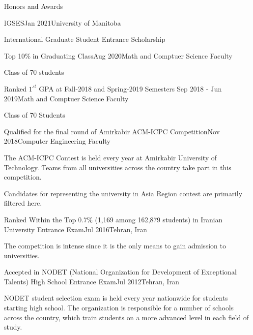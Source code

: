 \documentclass{resume} %
\begin{document}
	\begin{rSection}{Honors and Awards}
		\begin{rSubsection}{IGSES}{Jan 2021}{University of Manitoba}{ }
			\item International Graduate Student Entrance Scholarship
		\end{rSubsection}
		
		\begin{rSubsection}{Top 10\% in Graduating Class}{Aug 2020}{Math and Comptuer Science Faculty}{ }
			\item Class of 70 students
		\end{rSubsection}
		
		\begin{rSubsection}{Ranked $1^{st}$ GPA at Fall-2018 and Spring-2019 Semesters }{Sep 2018 - Jun 2019}{Math and Comptuer Science Faculty}{ }
			\item Class of 70 Students
		\end{rSubsection}	
		
		\begin{rSubsection}{Qualified for the final round of Amirkabir ACM-ICPC Competition}{Nov 2018}{Computer Engineering Faculty}{ }
			\item The ACM-ICPC Contest is held every year at Amirkabir University of Technology. Teams from all universities across the country take part in this competition.
			\item Candidates for representing the university in Asia Region contest are primarily filtered here.
		\end{rSubsection}
		
		\begin{rSubsection}{Ranked Within the Top 0.7\% (1,169 among 162,879 students) in Iranian University Entrance Exam}{Jul 2016}{Tehran, Iran }{ }
			\item The competition is intense since it is the only means to gain admission to universities.
		\end{rSubsection} 
		
		\begin{rSubsection}{Accepted in NODET (National Organization for Development of Exceptional Talents) High School Entrance Exam}{Jul 2012}{Tehran, Iran }{ }
			\item NODET student selection exam is held every year nationwide for students starting high school. The organization is responsible for a number of schools across the country, which train students on a more advanced level in each field of study.
		\end{rSubsection}
		
	\end{rSection}
\end{document}
